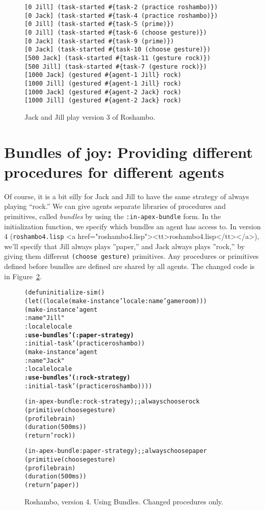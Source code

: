 \documentclass[12pt]{article}
\newcommand{\ic}{\texttt}
\newcommand{\firstref}{\textit}
\newenvironment{code}%
   {\begin{alltt}}%
   {\end{alltt}}
\newenvironment{float}%
   {\begin{center}}%
   {\end{center}
   }
\newcommand{\fn}[1]{\texonly\texttt{#1}\endtexonly
  \htmlonly \rawhtml <a href="#1"><tt>#1</tt></a>\endrawhtml \endhtmlonly}
\begin{document}
\begin{figure}
\begin{float}
\begin{verbatim}
[0 Jill] (task-started #{task-2 (practice roshambo)})
[0 Jack] (task-started #{task-4 (practice roshambo)})
[0 Jill] (task-started #{task-5 (prime)})
[0 Jill] (task-started #{task-6 (choose gesture)})
[0 Jack] (task-started #{task-9 (prime)})
[0 Jack] (task-started #{task-10 (choose gesture)})
[500 Jack] (task-started #{task-11 (gesture rock)})
[500 Jill] (task-started #{task-7 (gesture rock)})
[1000 Jack] (gestured #{agent-1 Jill} rock)
[1000 Jill] (gestured #{agent-1 Jill} rock)
[1000 Jack] (gestured #{agent-2 Jack} rock)
[1000 Jill] (gestured #{agent-2 Jack} rock)
\end{verbatim}
\end{float}
\caption{Jack and Jill play version 3 of Roshambo.\label{fig.trace.roshambo.3}}
\end{figure}

\htmlpagebreak
\section{Bundles of joy: Providing different procedures for different agents}

Of course, it is a bit silly for Jack and Jill to have the same strategy of always playing ``rock.'' We can give agents separate libraries of procedures and primitives, called \firstref{bundles} by using the \ic{:in-apex-bundle} form. In the initialization function, we specify which bundles an agent has access to. In version 4 (\fn{roshambo4.lisp}), we'll specify that Jill always plays ''paper,'' and Jack always plays ''rock,'' by giving them different \ic{(choose gesture)} primitives. Any procedures or primitives defined before bundles are defined are shared by all agents. The changed code is in Figure~\ref{fig.roshambo.4}.

\begin{figure}
\begin{float}
\begin{code}
(defun initialize-sim ()
  (let ((locale (make-instance 'locale :name 'gameroom)))
    (make-instance 'agent
      :name "Jill"
      :locale locale
      {\bf :use-bundles '(:paper-strategy)}
      :initial-task '(practice roshambo))
    (make-instance 'agent
      :name "Jack"
      :locale locale
      {\bf :use-bundles '(:rock-strategy)}
      :initial-task '(practice roshambo))))
  
(in-apex-bundle :rock-strategy)    ;; always choose rock
(primitive (choose gesture)
  (profile brain)
  (duration (500 ms))
  (return 'rock))

(in-apex-bundle :paper-strategy)   ;; always choose paper
(primitive (choose gesture)
  (profile brain)
  (duration (500 ms))
  (return 'paper))
\end{code}
\end{float}
\caption{Roshambo, version 4. Using Bundles. Changed procedures only.\label{fig.roshambo.4}}
\end{figure}
\end{document}
